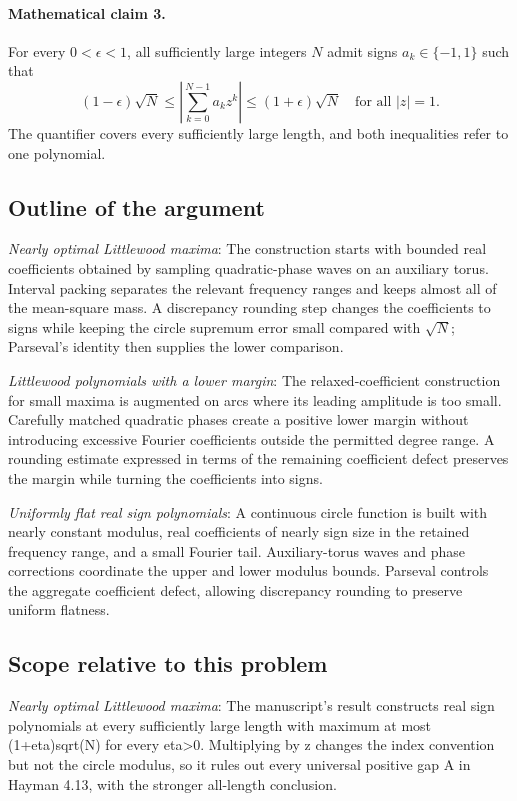 \documentclass[11pt]{article}
\begin{document}
\paragraph{Mathematical claim 3.} For every $0<\epsilon<1$, all sufficiently large integers $N$ admit signs $a_k\in\{-1,1\}$ such that \[(1-\epsilon)\sqrt N\le\left|\sum_{k=0}^{N-1}a_kz^k\right|\le(1+\epsilon)\sqrt N\quad\text{for all }|z|=1.\] The quantifier covers every sufficiently large length, and both inequalities refer to one polynomial.

\subsection{Outline of the argument}
\textit{Nearly optimal Littlewood maxima}: The construction starts with bounded real coefficients obtained by sampling quadratic-phase waves on an auxiliary torus. Interval packing separates the relevant frequency ranges and keeps almost all of the mean-square mass. A discrepancy rounding step changes the coefficients to signs while keeping the circle supremum error small compared with $\sqrt N$; Parseval’s identity then supplies the lower comparison.

\textit{Littlewood polynomials with a lower margin}: The relaxed-coefficient construction for small maxima is augmented on arcs where its leading amplitude is too small. Carefully matched quadratic phases create a positive lower margin without introducing excessive Fourier coefficients outside the permitted degree range. A rounding estimate expressed in terms of the remaining coefficient defect preserves the margin while turning the coefficients into signs.

\textit{Uniformly flat real sign polynomials}: A continuous circle function is built with nearly constant modulus, real coefficients of nearly sign size in the retained frequency range, and a small Fourier tail. Auxiliary-torus waves and phase corrections coordinate the upper and lower modulus bounds. Parseval controls the aggregate coefficient defect, allowing discrepancy rounding to preserve uniform flatness.

\subsection{Scope relative to this problem}
\textit{Nearly optimal Littlewood maxima}: The manuscript’s result constructs real sign polynomials at every sufficiently large length with maximum at most (1+eta)sqrt(N) for every eta>0. Multiplying by z changes the index convention but not the circle modulus, so it rules out every universal positive gap A in Hayman 4.13, with the stronger all-length conclusion.
\end{document}
